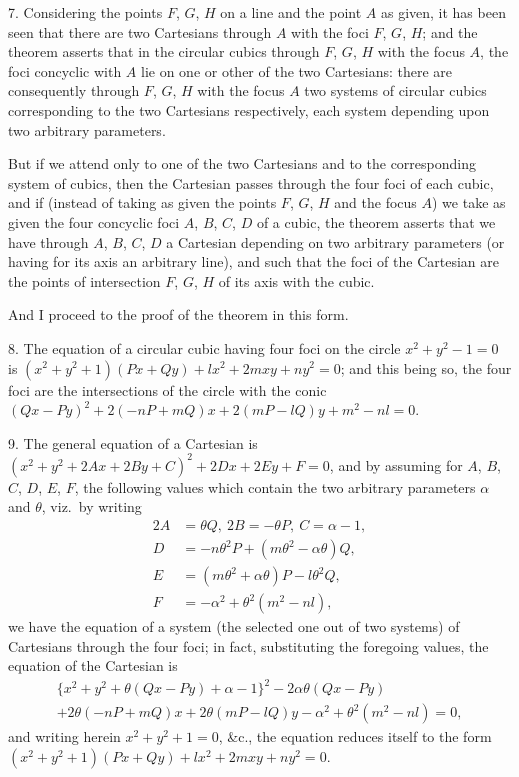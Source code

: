 \documentclass[11pt,a4paper]{article}
\theoremstyle{plain}
\theoremstyle{definition}
\theoremstyle{remark}
\begin{document}
7. Considering the points $F$, $G$, $H$ on a line and the point $A$ as given, it has been seen that there are two Cartesians through $A$ with the foci $F$, $G$, $H$; and the theorem asserts that in the circular cubics through $F$, $G$, $H$ with the focus $A$, the foci concyclic with $A$ lie on one or other of the two Cartesians: there are consequently through $F$, $G$, $H$ with the focus $A$ two systems of circular cubics corresponding to the two Cartesians respectively, each system depending upon two arbitrary parameters.

But if we attend only to one of the two Cartesians and to the corresponding system of cubics, then the Cartesian passes through the four foci of each cubic, and if (instead of taking as given the points $F$, $G$, $H$ and the focus $A$) we take as given the four concyclic foci $A$, $B$, $C$, $D$ of a cubic, the theorem asserts that we have through $A$, $B$, $C$, $D$ a Cartesian depending on two arbitrary parameters (or having for its axis an arbitrary line), and such that the foci of the Cartesian are the points of intersection $F$, $G$, $H$ of its axis with the cubic.

And I proceed to the proof of the theorem in this form.

8. The equation of a circular cubic having four foci on the circle $x^{2}+y^{2}-1=0$ is $(x^{2}+y^{2}+1)(Px+Qy)+lx^{2}+2mxy+ny^{2}=0$; and this being so, the four foci are the intersections of the circle with the conic $(Qx-Py)^{2}+2(-nP+mQ)x+2(mP-lQ)y+m^{2}-nl=0$.

9. The general equation of a Cartesian is $(x^{2}+y^{2}+2Ax+2By+C)^{2}+2Dx+2Ey+F=0$, and by assuming for $A$, $B$, $C$, $D$, $E$, $F$, the following values which contain the two arbitrary parameters $\alpha$ and $\theta$, viz.\ by writing
\begin{align*}
2A &= \theta Q,\ 2B=-\theta P,\ C=\alpha-1,\\
D &= -n\theta^{2}P+(m\theta^{2}-\alpha\theta)Q,\\
E &= (m\theta^{2}+\alpha\theta)P-l\theta^{2}Q,\\
F &= -\alpha^{2}+\theta^{2}(m^{2}-nl),
\end{align*}
we have the equation of a system (the selected one out of two systems) of Cartesians through the four foci; in fact, substituting the foregoing values, the equation of the Cartesian is
\begin{multline*}
\{x^{2}+y^{2}+\theta(Qx-Py)+\alpha-1\}^{2}-2\alpha\theta(Qx-Py)\\
+2\theta(-nP+mQ)x+2\theta(mP-lQ)y-\alpha^{2}+\theta^{2}(m^{2}-nl)=0,
\end{multline*}
and writing herein $x^{2}+y^{2}+1=0$, \&c., the equation reduces itself to the form $(x^{2}+y^{2}+1)(Px+Qy)+lx^{2}+2mxy+ny^{2}=0$.
\end{document}
